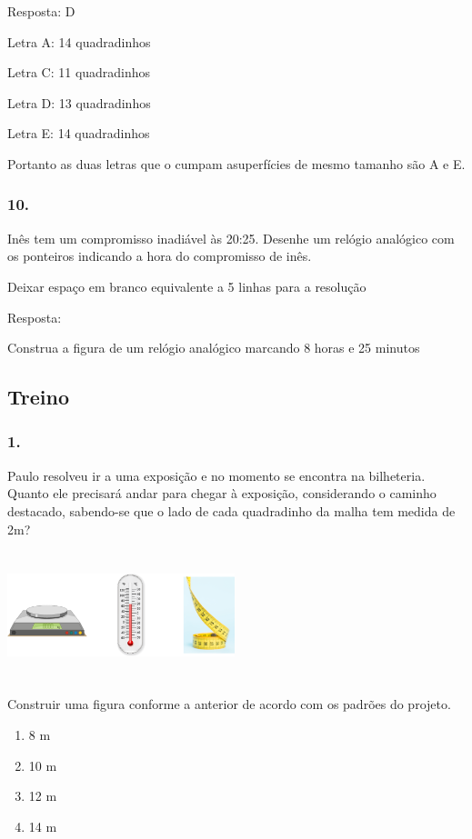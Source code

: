 Resposta: D

Letra A: 14 quadradinhos

Letra C: 11 quadradinhos

Letra D: 13 quadradinhos

Letra E: 14 quadradinhos

Portanto as duas letras que o cumpam asuperfícies de mesmo tamanho são A
e E.

\subsubsection{10.}\label{section-61}

Inês tem um compromisso inadiável às 20:25. Desenhe um relógio analógico
com os ponteiros indicando a hora do compromisso de inês.

Deixar espaço em branco equivalente a 5 linhas para a resolução

Resposta:

Construa a figura de um relógio analógico marcando 8 horas e 25 minutos

\subsection{Treino}\label{treino-4}

\subsubsection{1.}\label{section-62}

Paulo resolveu ir a uma exposição e no momento se encontra na
bilheteria. Quanto ele precisará andar para chegar à exposição,
considerando o caminho destacado, sabendo-se que o lado de cada
quadradinho da malha tem medida de 2m?

\includegraphics[width=2.60897in,height=1.46587in]{media/image70.png}

Construir uma figura conforme a anterior de acordo com os padrões do
projeto.

\begin{enumerate}
\def\labelenumi{\alph{enumi})}
\item
  8 m
\item
  10 m
\item
  12 m
\item
  14 m
\end{enumerate}

